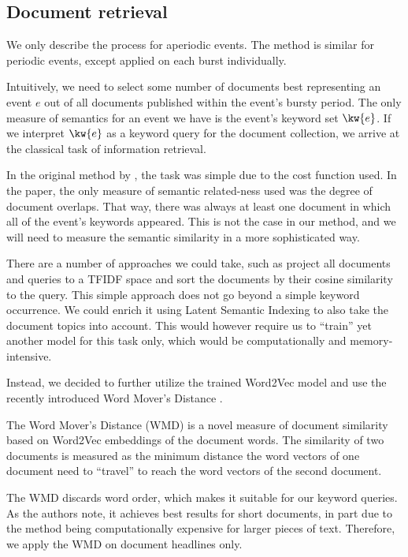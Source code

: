 \begin{enumerate}
\section{Document retrieval}
We only describe the process for aperiodic events. The method is similar for periodic events, except applied on each burst individually.

Intuitively, we need to select some number of documents best representing an event $e$ out of all documents published within the event's bursty period. The only measure of semantics for an event we have is the event's keyword set $\kw{e}$. If we interpret $\kw{e}$ as a keyword query for the document collection, we arrive at the classical task of information retrieval.

In the original method by \cite{event-detection}, the task was simple due to the cost function used. In the paper, the only measure of semantic related-ness used was the degree of document overlaps. That way, there was always at least one document in which all of the event's keywords appeared. This is not the case in our method, and we will need to measure the semantic similarity in a more sophisticated way.

There are a number of approaches we could take, such as project all documents and queries to a TFIDF space \cite{information-retrieval} and sort the documents by their cosine similarity to the query. This simple approach does not go beyond a simple keyword occurrence. We could enrich it using Latent Semantic Indexing \cite{lsi} to also take the document topics into account. This would however require us to ``train'' yet another model for this task only, which would be computationally and memory-intensive.

Instead, we decided to further utilize the trained Word2Vec model and use the recently introduced Word Mover's Distance \cite{wmd}.

The Word Mover's Distance (WMD) is a novel measure of document similarity based on Word2Vec embeddings of the document words. The similarity of two documents is measured as the minimum distance the word vectors of one document need to ``travel'' to reach the word vectors of the second document.

The WMD discards word order, which makes it suitable for our keyword queries. As the authors note, it achieves best results for short documents, in part due to the method being computationally expensive for larger pieces of text. Therefore, we apply the WMD on document headlines only.


\end{enumerate}
